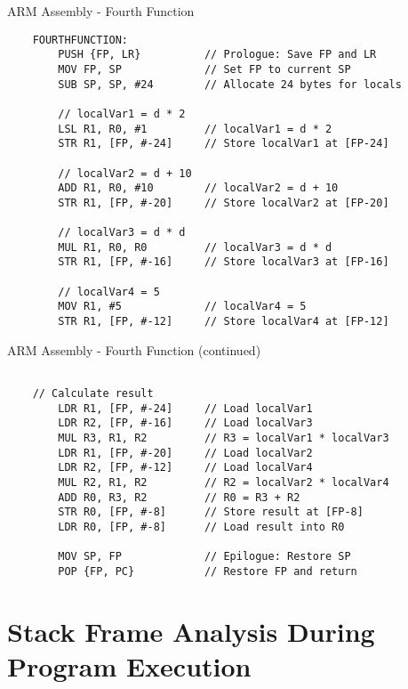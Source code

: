 \documentclass[aspectratio=169]{beamer}
\begin{document}
\begin{frame}[fragile]{ARM Assembly - Fourth Function}
    \begin{verbatim}
    FOURTHFUNCTION:
        PUSH {FP, LR}          // Prologue: Save FP and LR
        MOV FP, SP             // Set FP to current SP
        SUB SP, SP, #24        // Allocate 24 bytes for locals
    
        // localVar1 = d * 2
        LSL R1, R0, #1         // localVar1 = d * 2
        STR R1, [FP, #-24]     // Store localVar1 at [FP-24]
    
        // localVar2 = d + 10
        ADD R1, R0, #10        // localVar2 = d + 10
        STR R1, [FP, #-20]     // Store localVar2 at [FP-20]
    
        // localVar3 = d * d
        MUL R1, R0, R0         // localVar3 = d * d
        STR R1, [FP, #-16]     // Store localVar3 at [FP-16]
    
        // localVar4 = 5
        MOV R1, #5             // localVar4 = 5
        STR R1, [FP, #-12]     // Store localVar4 at [FP-12]

\end{verbatim}
\end{frame}

\begin{frame}[fragile]{ARM Assembly - Fourth Function (continued)}
    \begin{verbatim}

    // Calculate result
        LDR R1, [FP, #-24]     // Load localVar1
        LDR R2, [FP, #-16]     // Load localVar3
        MUL R3, R1, R2         // R3 = localVar1 * localVar3
        LDR R1, [FP, #-20]     // Load localVar2
        LDR R2, [FP, #-12]     // Load localVar4
        MUL R2, R1, R2         // R2 = localVar2 * localVar4
        ADD R0, R3, R2         // R0 = R3 + R2
        STR R0, [FP, #-8]      // Store result at [FP-8]
        LDR R0, [FP, #-8]      // Load result into R0
    
        MOV SP, FP             // Epilogue: Restore SP
        POP {FP, PC}           // Restore FP and return
    \end{verbatim}
\end{frame}


\section{Stack Frame Analysis During Program Execution}
\end{document}
